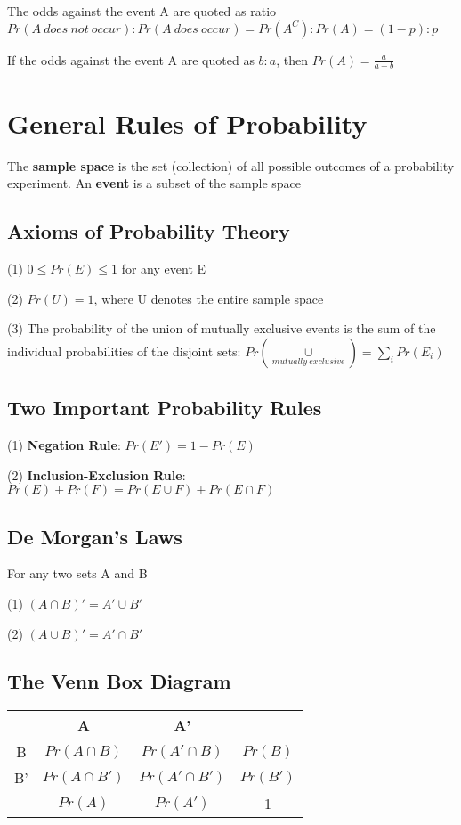 \documentclass[12pt]{article}
\DeclareMathOperator*{\CP}{\cup}
\begin{document}
\begin{spacing}{2.0}
The odds against the event A are quoted as ratio $Pr(A\ does\ not\ occur):Pr(A\ does\ occur)= Pr(A^C):Pr(A)= (1-p): p$

If the odds against the event A are quoted as $b:a$, then $Pr(A)=\frac{a}{a+b}$

\section{General Rules of Probability}

The \textbf{sample space} is the set (collection) of all possible outcomes of a probability experiment. An \textbf{event} is a subset of the sample space

\subsection{Axioms of Probability Theory}

(1) $0 \le Pr(E) \le 1$ for any event E

(2) $Pr(U)=1$, where U denotes the entire sample space

(3) The probability of the union of mutually exclusive events is the sum of the individual probabilities of the disjoint sets: $Pr\left( \CP\limits_{mutually\ exclusive} \right)= \sum\limits_i Pr(E_i)$

\subsection{Two Important Probability Rules}

(1) \textbf{Negation Rule}: $Pr(E')=1-Pr(E)$

(2) \textbf{Inclusion-Exclusion Rule}: $Pr(E)+Pr(F) = Pr(E \cup F)+ Pr(E \cap F)$

\subsection{De Morgan's Laws}

For any two sets A and B

(1) $(A\cap B)'= A' \cup B'$

(2) $(A \cup B)' = A' \cap B'$

\subsection{The Venn Box Diagram}

\begin{tabular}{|c|c|c|c|}
  \hline
    & A & A' &  \\
  \hline
  B & $Pr(A\cap B)$ & $Pr(A' \cap B)$ & $Pr(B)$ \\
  \hline
  B' & $Pr(A\cap B')$ & $Pr(A'\cap B')$ & $Pr(B')$ \\
  \hline
    & $Pr(A)$ & $Pr(A')$ & 1 \\
  \hline
\end{tabular}


\end{spacing}
\end{document}

